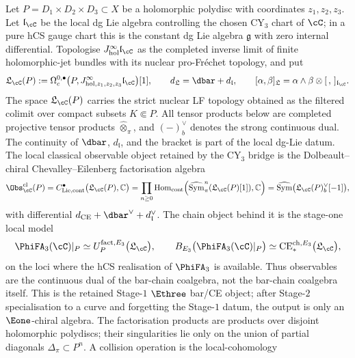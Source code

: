 \begin{definition}
\label{def:cy3-many-variable-chiral-ce}
Let $P=D_1\times D_2\times D_3\subset X$ be a holomorphic polydisc with
coordinates $z_1,z_2,z_3$. Let $\mathfrak l_{\cC}$ be the local dg
Lie algebra controlling the chosen CY$_3$ chart of $\cC$; in a pure hCS
gauge chart this is the constant dg Lie algebra $\mathfrak g$ with
zero internal differential. Topologise
$J^\infty_{\mathrm{hol}}\mathfrak l_{\cC}$ as the completed inverse
limit of finite holomorphic-jet bundles with its nuclear pro-Fr\'echet
topology, and put
\[
 \mathfrak L_{\cC}(P)
 :=
 \Omega^{0,\bullet}_c
 \bigl(P,J^\infty_{\mathrm{hol},z_1,z_2,z_3}\mathfrak l_{\cC}\bigr)[1],
 \qquad
 d_{\mathfrak L}=\dbar+d_{\mathfrak l},
 \qquad
 [\alpha,\beta]_{\mathfrak L}
 =
 \alpha\wedge\beta\otimes[\,,\,]_{\mathfrak l_{\cC}}.
\]
The space $\mathfrak L_{\cC}(P)$ carries the strict nuclear LF topology
obtained as the filtered colimit over compact subsets $K\Subset P$.
All tensor products below are completed projective tensor products
$\widehat\otimes_\pi$, and $(-)^\vee_b$ denotes the strong continuous
dual. The continuity of $\dbar$, $d_{\mathfrak l}$, and the bracket is
part of the local dg-Lie datum.
The local classical observable object retained by the CY$_3$
bridge is the Dolbeault--chiral Chevalley--Eilenberg factorisation
algebra
\[
 \Obs_{\cC}^{\mathrm{cl}}(P)
 =
 C^\bullet_{\mathrm{Lie,cont}}\bigl(\mathfrak L_{\cC}(P),\mathbb C\bigr)
 =
 \prod_{n\geq0}
 \mathrm{Hom}_{\mathrm{cont}}
 \!\left(
 \widehat{\mathrm{Sym}}^n_\pi(\mathfrak L_{\cC}(P)[1]),
 \mathbb C
 \right)
 =
 \widehat{\mathrm{Sym}}
 \bigl(\mathfrak L_{\cC}(P)^\vee_b[-1]\bigr),
\]
with differential $d_{\mathrm{CE}}+\dbar^\vee+d_{\mathfrak l}^\vee$.
The chain object behind it is the stage-one local model
\[
 \PhiFA_3(\cC)|_P
 \simeq
 U^{\mathrm{fact},E_3}_{P}
 \bigl(\mathfrak L_{\cC}\bigr),
 \qquad
 B_{E_3}\bigl(\PhiFA_3(\cC)|_P\bigr)
 \simeq
 \mathrm{CE}^{\mathrm{ch},E_3}_*
 \bigl(\mathfrak L_{\cC}\bigr),
\]
on the loci where the hCS realisation of $\PhiFA_3$ is available. Thus
observables are the continuous dual of the bar-chain coalgebra, not the
bar-chain coalgebra itself. This is the retained Stage-$1$ $\Ethree$
bar/CE object; after Stage-$2$ specialisation to a curve and forgetting
the Stage-$1$ datum, the output is only an $\Eone$-chiral algebra. The
factorisation products are products over disjoint holomorphic polydiscs;
their singularities lie only on the union of partial diagonals
$\Delta_\pi\subset P^n$. A collision operation is the local-cohomology

\end{definition}
